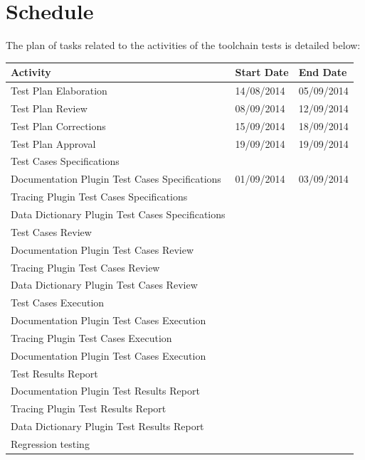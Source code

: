 \section{Schedule}
The plan of tasks related to the activities of the toolchain tests is detailed below:
\begin{table}[htbp]
\centering
\begin{tabular}{|p{8cm}|p{3cm}|p{3cm}|}\hline
\textbf{Activity} & \textbf{Start Date} & \textbf{End Date}\\\hline
Test Plan Elaboration & 14/08/2014 & 05/09/2014 \\\hline
Test Plan Review & 08/09/2014 & 12/09/2014\\\hline
Test Plan Corrections & 15/09/2014 & 18/09/2014\\\hline
Test Plan Approval & 19/09/2014 & 19/09/2014\\\hline
\multicolumn{3}{|l|}{Test Cases Specifications}\\\hline
Documentation Plugin Test Cases Specifications & 01/09/2014 & 03/09/2014\\\hline
Tracing Plugin Test Cases Specifications & & \\\hline
Data Dictionary Plugin Test Cases Specifications & & \\\hline
\multicolumn{3}{|l|}{Test Cases Review}\\\hline
Documentation Plugin Test Cases Review & & \\\hline
Tracing Plugin Test Cases Review & & \\\hline
Data Dictionary Plugin Test Cases Review & & \\\hline
\multicolumn{3}{|l|}{Test Cases Execution}\\\hline
Documentation Plugin Test Cases Execution & & \\\hline
Tracing Plugin Test Cases Execution & & \\\hline
Documentation Plugin Test Cases Execution & & \\\hline
\multicolumn{3}{|l|}{Test Results Report}\\\hline
Documentation Plugin Test Results Report & & \\\hline
Tracing Plugin Test Results Report & & \\\hline
Data Dictionary Plugin Test Results Report & & \\\hline
Regression testing & & \\\hline
\end{tabular}
\end{table}

